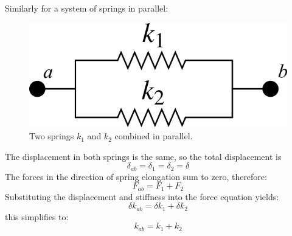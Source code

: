 \documentclass[12pt,letter]{article}
\begin{document}
			Similarly for a system of springs in parallel:
			\begin{figure}[H]
				\centering
				\includegraphics[]{../figures/equivalent_stiffness_parallel.png}
				\caption{Two springs $k_1$ and $k_2$ combined in parallel.}				
			\end{figure}			
			\noindent The displacement in both springs is the same, so the total displacement is 
			\begin{equation}
				\delta_{ab} = \delta_{\text{1}} =  \delta_{\text{2}} = \delta
			\end{equation}
			The forces in the direction of spring elongation sum to zero, therefore:
			\begin{equation}
				F_{ab} = F_{\text{1}} +  F_{\text{2}}
			\end{equation}			
			Substituting the displacement and stiffness into the force equation yields:
			\begin{equation}
				\delta k_{ab} = 	\delta k_{1} +  \delta k_{2}
			\end{equation}				
			this simplifies to:
			\begin{equation}
				k_{ab} = k_1+k_2
			\end{equation}
			
\end{document}
